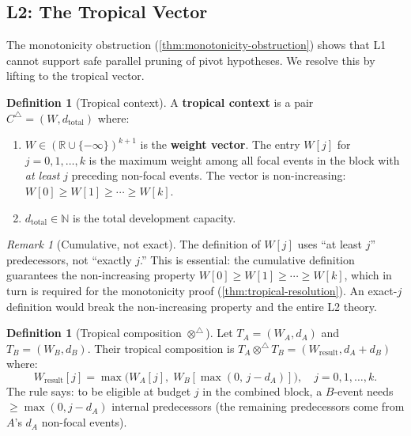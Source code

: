 \documentclass[11pt]{article}
\theoremstyle{plain}
\theoremstyle{definition}
\newtheorem{definition}[theorem]{Definition}
\theoremstyle{remark}
\newtheorem{remark}[theorem]{Remark}
\newcommand{\R}{\mathbb{R}}
\newcommand{\N}{\mathbb{N}}
\newcommand{\optrop}{\otimes^{\triangle}}
\newcommand{\dtotal}{{d_{\mathrm{total}}}}
\newcommand{\Ctrop}{{C^{\triangle}}}
\begin{document}
\subsection{L2: The Tropical Vector}\label{subsec:l2}

The monotonicity obstruction (\cref{thm:monotonicity-obstruction})
shows that L1 cannot support safe parallel pruning of pivot
hypotheses.  We resolve this by lifting to the tropical vector.

\begin{definition}[Tropical context]\label{def:tropical-context}
A \textbf{tropical context} is a pair
$\Ctrop = (W, \dtotal)$ where:
\begin{enumerate}[label=(\roman*),nosep]
  \item $W \in (\R \cup \{-\infty\})^{k+1}$ is the \textbf{weight
    vector}.  The entry $W[j]$ for $j = 0, 1, \ldots, k$ is the
    maximum weight among all focal events in the block with \emph{at
    least} $j$ preceding non-focal events.  The vector is
    non-increasing: $W[0] \ge W[1] \ge \cdots \ge W[k]$.
  \item $\dtotal \in \N$ is the total development capacity.
\end{enumerate}
\end{definition}

\begin{remark}[Cumulative, not exact]\label{rem:cumulative}
The definition of $W[j]$ uses ``at least $j$'' predecessors, not
``exactly $j$.''  This is essential: the cumulative definition
guarantees the non-increasing property $W[0] \ge W[1] \ge \cdots \ge
W[k]$, which in turn is required for the monotonicity proof
(\cref{thm:tropical-resolution}).  An exact-$j$ definition would break
the non-increasing property and the entire L2 theory.
\end{remark}

\begin{definition}[Tropical composition $\optrop$]
\label{def:tropical-composition}
Let $T_A = (W_A, d_A)$ and $T_B = (W_B, d_B)$.  Their tropical
composition is $T_A \optrop T_B = (W_{\mathrm{result}}, d_A + d_B)$
where:
\begin{equation}\label{eq:shift-and-max}
  W_{\mathrm{result}}[j]
  = \max\!\bigl(W_A[j],\; W_B[\max(0,\, j - d_A)]\bigr),
  \quad j = 0, 1, \ldots, k.
\end{equation}
The rule says: to be eligible at budget $j$ in the combined block, a
$B$-event needs $\ge \max(0, j - d_A)$ internal predecessors (the
remaining predecessors come from $A$'s $d_A$ non-focal events).
\end{definition}
\end{document}
